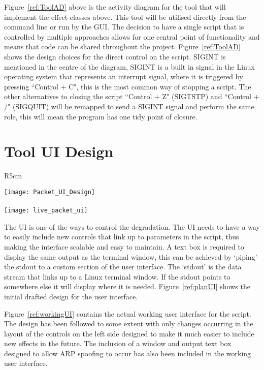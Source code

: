 Figure~\ref{ref:ToolAD} above is the activity diagram for the tool that will implement the effect classes above. This tool will be utilised directly from the command line or run by the GUI. The decision to have a single script that is controlled by multiple approaches allows for one central point of functionality and means that code can be shared throughout the project. Figure~\ref{ref:ToolAD} shows the design choices for the direct control on the script. SIGINT is mentioned in the centre of the diagram, SIGINT is a built in signal in the Linux operating system that represents an interrupt signal, where it is triggered by pressing ``Control + C", this is the most common way of stopping a script. The other alternatives to closing the script ``Control + Z" (SIGTSTP) and ``Control + /" (SIGQUIT) will be remapped to send a SIGINT signal and perform the same role, this will mean the program has one tidy point of closure.

%
\section{Tool UI Design}
\begin{wrapfigure}{R}{5cm}
\begin{center}
	\texttt{[image: Packet\_UI\_Design]}
	\caption{Initial user interface design for the Degradation GUI}
	\label{ref:planUI}
	\paragraph{}
	\texttt{[image: live\_packet\_ui]}
	\caption{Actual working Packet user interface}
	\label{ref:workingUI}
\end{center}	
\end{wrapfigure}

The UI is one of the ways to control the degradation. The UI needs to have a way to easily include new controls that link up to parameters in the script, thus making the interface scalable and easy to maintain. A text box is required to display the same output as the terminal window, this can be achieved by `piping' the stdout to a custom section of the user interface. The `stdout' is the data stream that links up to a Linux terminal window. If the stdout points to somewhere else it will display where it is needed. Figure~\ref{ref:planUI} shows the initial drafted design for the user interface.

Figure~\ref{ref:workingUI} contains the actual working user interface for the script. The design has been followed to some extent with only changes occurring in the layout of the controls on the left side designed to make it much easier to include new effects in the future. The inclusion of a window and output text box designed to allow ARP spoofing to occur has also been included in the working user interface.

